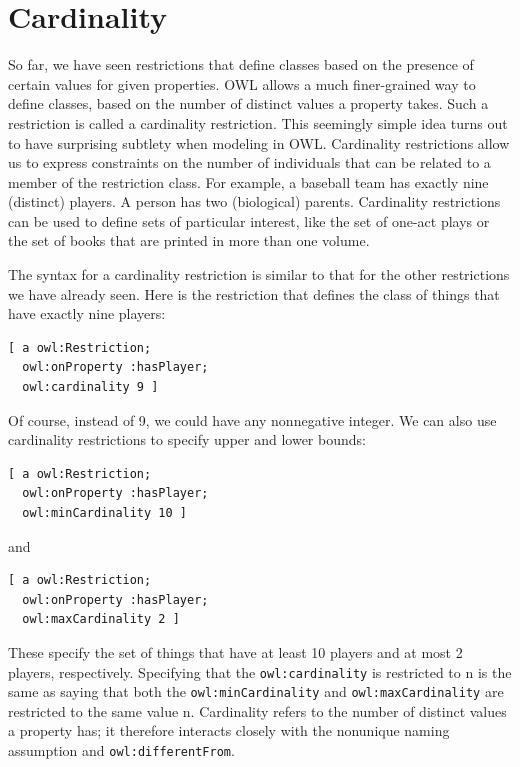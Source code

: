 \section{Cardinality}

So far, we have seen restrictions that define classes based on the
presence of certain values for given properties. OWL allows a much
finer-grained way to define classes, based on the number of distinct
values a property takes. Such a restriction is called a cardinality
restriction. This seemingly simple idea turns out to have surprising
subtlety when modeling in OWL. Cardinality restrictions allow us to
express constraints on the number of individuals that can be related to
a member of the restriction class. For example, a baseball team has
exactly nine (distinct) players. A person has two (biological) parents.
Cardinality restrictions can be used to define sets of particular
interest, like the set of one-act plays or the set of books that are
printed in more than one volume.

The syntax for a cardinality restriction is similar to that for the
other restrictions we have already
seen. Here is the restriction that defines the class of things that have
exactly nine players:

\begin{lstlisting}
[ a owl:Restriction;
  owl:onProperty :hasPlayer;
  owl:cardinality 9 ]
\end{lstlisting}

Of course, instead of 9, we could have any nonnegative integer. We can
also use cardinality restrictions to specify upper and lower bounds:

\begin{lstlisting}
[ a owl:Restriction;
  owl:onProperty :hasPlayer;
  owl:minCardinality 10 ]
\end{lstlisting}

and

\begin{lstlisting}
[ a owl:Restriction;
  owl:onProperty :hasPlayer;
  owl:maxCardinality 2 ]
\end{lstlisting}

These specify the set of things that have at least 10 players and at
most 2 players, respectively. Specifying that the \texttt{owl:cardinality} is
restricted to n is the same as saying that both the \texttt{owl:minCardinality}
and \texttt{owl:maxCardinality} are restricted to the same value n. Cardinality
refers to the number of distinct values a property has; it therefore
interacts closely with the nonunique naming assumption and
\texttt{owl:differentFrom}.

